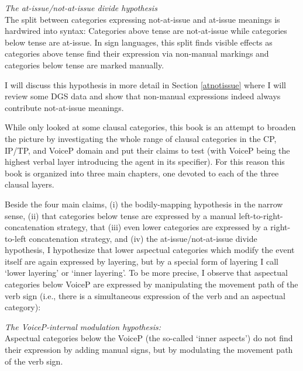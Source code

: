 \begin{exe}
\ex\textit{The at-issue/not-at-issue divide hypothesis}\\
The split between categories expressing not-at-issue and at-issue meanings is hardwired into syntax: Categories above tense are not-at-issue while categories below tense are at-issue.\label{atissuenotatissuedivide} In sign languages, this split finds visible effects as categories above tense find their expression via non-manual markings and categories below tense are marked manually.
\end{exe}

\noindent I will discuss this hypothesis in more detail in Section \ref{atnotissue} where I will review some DGS data and show that non-manual expressions indeed always contribute not-at-issue meanings. 

While \citet{bross2017scope} only looked at some clausal categories, this book is an attempt to broaden the picture by investigating the whole range of clausal categories in the CP, IP/TP, and VoiceP domain and put their claims to test (with VoiceP being the highest verbal layer introducing the agent in its specifier). For this reason this book is organized into three main chapters, one devoted to each of the three clausal layers. 

Beside the four main claims, (i) the bodily-mapping hypothesis in the narrow sense, (ii) that categories below tense are expressed by a manual left-to-right-concatenation strategy, that (iii) even lower categories are expressed by a right-to-left concatenation strategy, and (iv) the at-issue/not-at-issue divide hypothesis, I hypothesize that lower aspectual categories which modify the event itself are again expressed by layering, but by a special form of layering I call `lower layering' or `inner layering'. To be more precise, I observe that aspectual categories below VoiceP are expressed by manipulating the movement path of the verb sign (i.e., there is a simultaneous expression of the verb and an aspectual category):

\begin{exe}
\ex \textit{The VoiceP-internal modulation hypothesis:}\\
Aspectual categories below the VoiceP (the so-called `inner aspects') do not find their expression by adding manual signs, but by modulating the movement path of the verb sign. \label{vpinternalmodhyp}
\end{exe}


